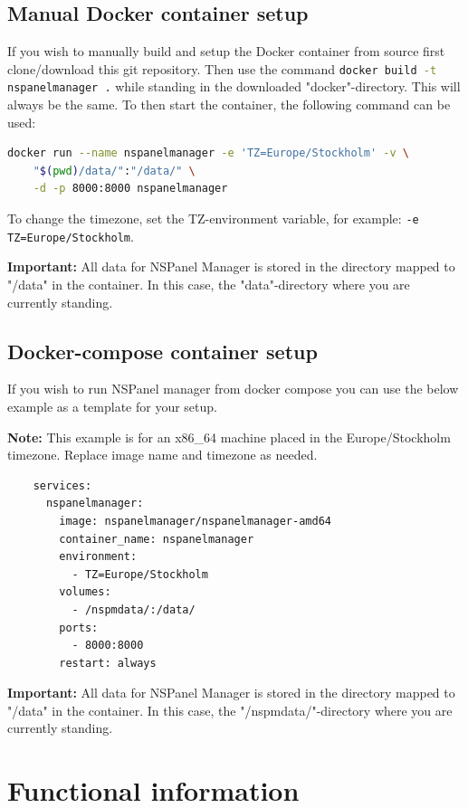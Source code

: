 \documentclass[10pt]{article}
\newcommand{\note}[1]{\begin{noteBox} \textbf{Note:} #1 \end{noteBox}}
\newcommand{\important}[1]{\begin{importantBox} \textbf{Important:} #1 \end{importantBox}}
\begin{document}
    \subsection{Manual Docker container setup}
    If you wish to manually build and setup the Docker container from source first clone/download this git repository. Then use the command \lstinline[language=bash]{docker build -t nspanelmanager .} while standing in the downloaded "docker"-directory. This will always be the same. To then start the container, the following command can be used:
    \begin{lstlisting}[language=bash]
    docker run --name nspanelmanager -e 'TZ=Europe/Stockholm' -v \
    "$(pwd)/data/":"/data/" \
    -d -p 8000:8000 nspanelmanager
    \end{lstlisting}
    To change the timezone, set the TZ-environment variable, for example: \lstinline[language=bash]{-e TZ=Europe/Stockholm}.
    \important{All data for NSPanel Manager is stored in the directory mapped to "/data" in the container. In this case, the "data"-directory where you are currently standing.}


    \subsection{Docker-compose container setup}
    If you wish to run NSPanel manager from docker compose you can use the below example as a template for your setup.
    \note{This example is for an x86\_64 machine placed in the Europe/Stockholm timezone. Replace image name and timezone as needed.}
    \begin{lstlisting}
    services:
      nspanelmanager:
        image: nspanelmanager/nspanelmanager-amd64
        container_name: nspanelmanager
        environment:
          - TZ=Europe/Stockholm
        volumes:
          - /nspmdata/:/data/
        ports:
          - 8000:8000
        restart: always
    \end{lstlisting}
    \important{All data for NSPanel Manager is stored in the directory mapped to "/data" in the container. In this case, the "/nspmdata/"-directory where you are currently standing.}

    \clearpage
    \section{Functional information}
\end{document}

